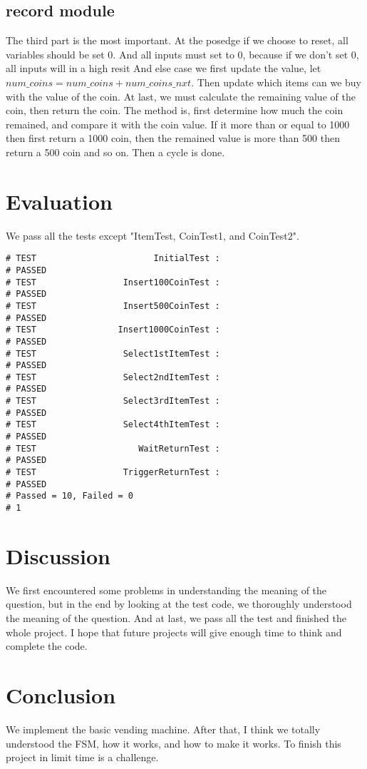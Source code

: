 \documentclass[12pt,a4paper]{article}
\begin{document}
\subsection{record module}

The third part is the most important.
At the posedge if we choose to reset, all variables should be set 0.
And all inputs must set to 0, because if we don't set 0, all inputs will in a high resit
And else case we first update the value, let $num\_coins =num\_coins + num\_coins\_nxt$.
Then update which items can we buy with the value of the coin.
At last, we must calculate the remaining value of the coin, then return the coin.
The method is, first determine how much the coin remained, and compare it with the coin value.
If it more than or equal to 1000 then first return a 1000 coin, then the remained value is more than 500 then return a 500 coin and so on.
Then a cycle is done.  


\newpage

\section{Evaluation}

We pass all the tests except "ItemTest, CoinTest1, and CoinTest2".

\lstset{language=Verilog}
\begin{lstlisting}
# TEST                       InitialTest :
# PASSED
# TEST                 Insert100CoinTest :
# PASSED
# TEST                 Insert500CoinTest :
# PASSED
# TEST                Insert1000CoinTest :
# PASSED
# TEST                 Select1stItemTest :
# PASSED
# TEST                 Select2ndItemTest :
# PASSED
# TEST                 Select3rdItemTest :
# PASSED
# TEST                 Select4thItemTest :
# PASSED
# TEST                    WaitReturnTest :
# PASSED
# TEST                 TriggerReturnTest :
# PASSED
# Passed = 10, Failed = 0
# 1
\end{lstlisting}

\newpage
\section{Discussion}

We first encountered some problems in understanding the meaning of the question, 
but in the end by looking at the test code, 
we thoroughly understood the meaning of the question.
And at last, we pass all the test and finished the whole project.
I hope that future projects will give enough time to think and complete the code.

\section{Conclusion}

We implement the basic vending machine.
After that, I think we totally understood the FSM, how it works, and how to make it works.
To finish this project in limit time is a challenge.
\end{document}
